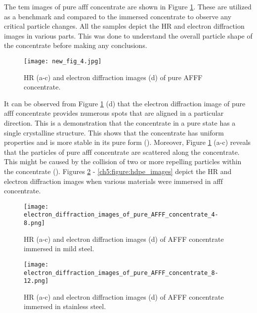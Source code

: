 The \acrshort{tem} images of pure \acrshort{afff} concentrate are shown in Figure \ref{ch5:figure:pure_afff_images}. These are utilized as a benchmark and compared to the immersed concentrate to observe any critical particle changes. All the samples depict the HR and electron diffraction images in various parts. This was done to understand the overall particle shape of the concentrate before making any conclusions.

\begin{figure}[H]
\centering
\texttt{[image: new\_fig\_4.jpg]}

\caption{HR (a-c) and electron diffraction images (d) of pure AFFF concentrate.}
\label{ch5:figure:pure_afff_images}
\end{figure}

It can be observed from Figure \ref{ch5:figure:pure_afff_images} (d) that the electron diffraction image of pure \acrshort{afff} concentrate provides numerous spots that are aligned in a particular direction. This is a demonstration that the concentrate in a pure state has a single crystalline structure. This shows that the concentrate has uniform properties and is more stable in its pure form (\cite{bandyopadhyay2019fabrication}). Moreover, Figure \ref{ch5:figure:pure_afff_images} (a-c) reveals that the particles of pure \acrshort{afff} concentrate are scattered along the concentrate. This might be caused by the collision of two or more repelling particles within the concentrate (\cite{pyrz2008particle}). Figures \ref{ch5:figure:mild_steel_images} - \ref{ch5:figure:hdpe_images} depict the HR and electron diffraction images when various materials were immersed in \acrshort{afff} concentrate. 
  
\begin{figure}[H]
\centering

\texttt{[image: electron\_diffraction\_images\_of\_pure\_AFFF\_concentrate\_4-8.png]}

\caption{HR (a-c) and electron diffraction images (d) of AFFF concentrate immersed in mild steel.}
\label{ch5:figure:mild_steel_images}
\end{figure}

\begin{figure}[H]
\centering

\texttt{[image: electron\_diffraction\_images\_of\_pure\_AFFF\_concentrate\_8-12.png]}

\caption{HR (a-c) and electron diffraction images (d) of AFFF concentrate immersed in stainless steel.}
\label{ch5:figure:stainless_steel_images}
\end{figure}

